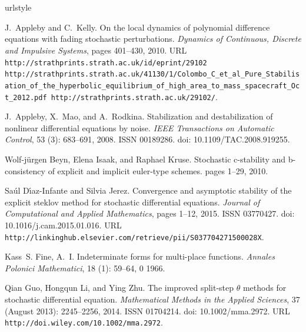 \documentclass[sort&compress, preprint]{elsarticle}
\theoremstyle{definition}
\theoremstyle{plain}%
\theoremstyle{remark}
\begin{document}
	\section*{\refname}
	\begin{thebibliography}{17}
\providecommand{\natexlab}[1]{#1}
\providecommand{\url}[1]{\texttt{#1}}
\expandafter\ifx\csname urlstyle\endcsname\relax
  \providecommand{\doi}[1]{doi: #1}\else
  \providecommand{\doi}{doi: \begingroup \urlstyle{rm}\Url}\fi

J.~Appleby and C.~Kelly.
\newblock On the local dynamics of polynomial difference equations with fading
  stochastic perturbations.
\newblock \emph{Dynamics of Continuous, Discrete and Impulsive Systems}, pages
  401--430, 2010.
\newblock URL \url{http://strathprints.strath.ac.uk/id/eprint/29102
  http://strathprints.strath.ac.uk/41130/1/Colombo\_C\_et\_al\_Pure\_Stabilisation\_of\_the\_hyperbolic\_equilibrium\_of\_high\_area\_to\_mass\_spacecraft\_Oct\_2012.pdf
  http://strathprints.strath.ac.uk/29102/}.

J.~Appleby, X.~Mao, and A.~Rodkina.
\newblock Stabilization and destabilization of nonlinear differential equations
  by noise.
\newblock \emph{IEEE Transactions on Automatic Control}, 53
  (3): 683--691, 2008.
\newblock ISSN 00189286.
\newblock \doi{10.1109/TAC.2008.919255}.

Wolf-j\"{u}rgen Beyn, Elena Isaak, and Raphael Kruse.
\newblock Stochastic c-stability and b-consistency of explicit and implicit
  euler-type schemes.
\newblock pages 1--29, 2010.

Sa\'{u}l D\'{\i}az-Infante and Silvia Jerez.
\newblock Convergence and asymptotic stability of the explicit steklov method
  for stochastic differential equations.
\newblock \emph{Journal of Computational and Applied Mathematics}, pages 1--12,
  2015.
\newblock ISSN 03770427.
\newblock \doi{10.1016/j.cam.2015.01.016}.
\newblock URL
  \url{http://linkinghub.elsevier.com/retrieve/pii/S037704271500028X}.

Kass~S. Fine, A.~I.
\newblock Indeterminate forms for multi-place functions.
\newblock \emph{Annales Polonici Mathematici}, 18 (1):
  59--64, 0 1966.

Qian Guo, Hongqun Li, and Ying Zhu.
\newblock The improved split-step $\theta$ methods for stochastic differential
  equation.
\newblock \emph{Mathematical Methods in the Applied Sciences}, 37
  (August 2013): 2245--2256, 2014.
\newblock ISSN 01704214.
\newblock \doi{10.1002/mma.2972}.
\newblock URL \url{http://doi.wiley.com/10.1002/mma.2972}.


\end{thebibliography}
\end{document}

